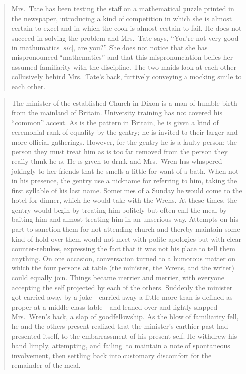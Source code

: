 \documentclass[openany,nobib]{tufte-book}
\begin{document}
\begin{quote}
Mrs.~Tate has been testing the staff on a mathematical puzzle printed in
the newspaper, introducing a kind of competition in which she is almost
certain to excel and in which the cook is almost certain to fail. He
does not succeed in solving the problem and Mrs.~Tate says, ``You're not
very good in mathumatics {[}\emph{sic}{]}, are you?'' She does not
notice that she has mispronounced ``mathematics'' and that this
mispronunciation belies her assumed familiarity with the discipline. The
two maids look at each other collusively behind Mrs.~Tate's back,
furtively conveying a mocking smile to each other.
\end{quote}

\begin{quote}
The minister of the established Church in Dixon is a man of humble birth
from the mainland of Britain. University training has not covered his
``common'' accent. As is the pattern in Britain, he is given a kind of
ceremonial rank of equality by the gentry; he is invited to their larger
and more official gatherings. However, for the gentry he is a faulty
person; the person they must treat him as is too far removed from the
person they really think he is. He is given to drink and Mrs.~Wren has
whispered jokingly to her friends that he smells a little for want of a
bath. When not in his presence, the gentry use a nickname for referring
to him, taking the first syllable of his last name. Sometimes of a
Sunday he would come to the hotel for dinner, which he would take with
the Wrens. At these times, the gentry would begin by treating him
politely but often end the meal by baiting him and almost treating him
in an unserious way. Attempts on his part to sanction them for not
attending church and thereby maintain some kind of hold over them would
not meet with polite apologies but with clear counter-rebukes,
expressing the fact that it was not his place to tell them anything. On
one occasion, conversation turned to a humorous matter on which the four
persons at table (the minister, the Wrens, and the writer) could equally
join. Things became merrier and merrier, with everyone accepting the
self projected by each of the others. Suddenly the minister got carried
away by a joke---carried away a little more than is defined as proper at
a middle-class table---and leaned over and lightly slapped Mrs.~Wren's
back, a slap of goodfellowship. As the blow of familiarity fell, he and
the others present realized that the minister's earthier past had
presented itself, to the embarrassment of his present self. He withdrew
his hand limply, attempting, and failing, to maintain a note of
spontaneous involvement, then settling back into customary discomfort
for the remainder of the meal.
\end{quote}
\end{document}
